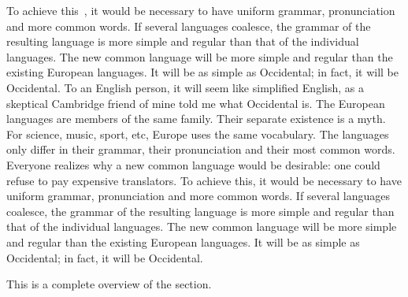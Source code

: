 To achieve this~\citep{Pazos:2005hl}, it would be necessary to have uniform grammar, pronunciation and more common words. If several languages coalesce, the grammar of the resulting language is more simple and regular than that of the individual languages. The new common language will be more simple and regular than the existing European languages. It will be as simple as Occidental; in fact, it will be Occidental. To an English person, it will seem like simplified English, as a skeptical Cambridge friend of mine told me what Occidental is. The European languages are members of the same family. Their separate existence is a myth. For science, music, sport, etc, Europe uses the same vocabulary. The languages only differ in their grammar, their pronunciation and their most common words. Everyone realizes why a new common language would be desirable: one could refuse to pay expensive translators. To achieve this, it would be necessary to have uniform grammar, pronunciation and more common words. If several languages coalesce, the grammar of the resulting language is more simple and regular than that of the individual languages. The new common language will be more simple and regular than the existing European languages. It will be as simple as Occidental; in fact, it will be Occidental.

This is a complete overview of the section.




